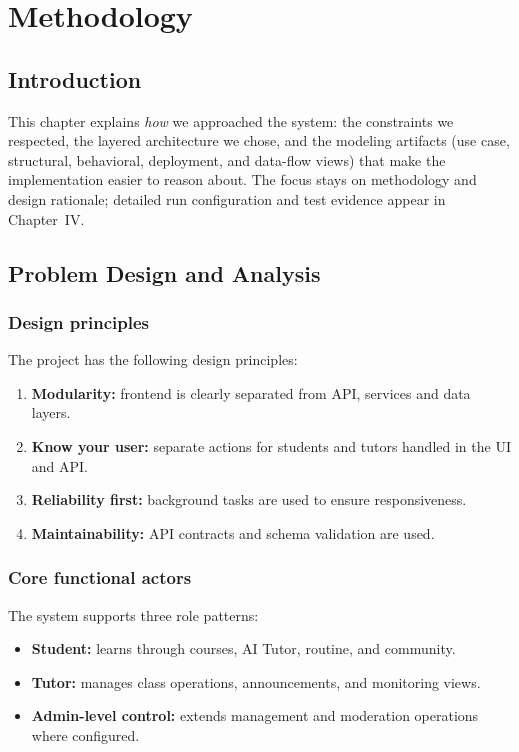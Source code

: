 \chapter{Methodology}
\label{ch:design}

\section{Introduction}
This chapter explains \emph{how} we approached the system: the constraints we respected, the layered architecture we chose, and the modeling artifacts (use case, structural, behavioral, deployment, and data-flow views) that make the implementation easier to reason about. The focus stays on methodology and design rationale; detailed run configuration and test evidence appear in Chapter~IV.

\section{Problem Design and Analysis}
\subsection{Design principles}
The project has the following design principles:
\begin{enumerate}[label=\arabic*.]
	\item \textbf{Modularity:} frontend is clearly separated from API, services and data layers.
	\item \textbf{Know your user:} separate actions for students and tutors handled in the UI and API.
	\item \textbf{Reliability first:} background tasks are used to ensure responsiveness.
	\item \textbf{Maintainability:} API contracts and schema validation are used.
\end{enumerate}

\subsection{Core functional actors}
The system supports three role patterns:
\begin{itemize}
\item \textbf{Student:} learns through courses, AI Tutor, routine, and community.
\item \textbf{Tutor:} manages class operations, announcements, and monitoring views.
\item \textbf{Admin-level control:} extends management and moderation operations where configured.
\end{itemize}

